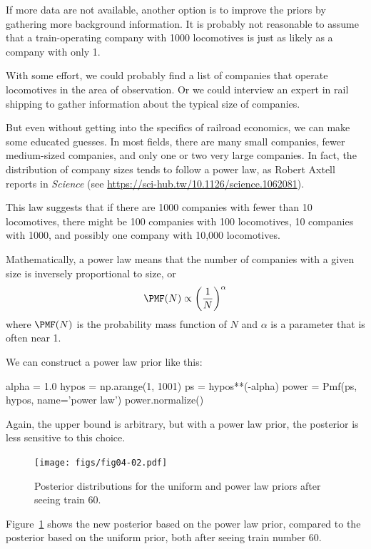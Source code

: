 \documentclass[12pt]{book}
\theoremstyle{exercise}
\begin{document}
If more data are not available, another option is to improve the
priors by gathering more background information.  
It is probably not reasonable to assume that a train-operating company with 1000 locomotives is just as likely as a company with only 1.

With some effort, we could probably find a list of companies that
operate locomotives in the area of observation.
Or we could interview an expert in rail shipping to gather information about the typical size of companies.

But even without getting into the specifics of railroad economics, we
can make some educated guesses.  
In most fields, there are many small
companies, fewer medium-sized companies, and only one or two very
large companies.  
In fact, the distribution of company sizes tends to
follow a power law, as Robert Axtell reports in {\it Science} (see
\url{https://sci-hub.tw/10.1126/science.1062081}).



This law suggests that if there are 1000 companies with fewer than
10 locomotives, there might be 100 companies with 100 locomotives,
10 companies with 1000, and possibly one company with 10,000 locomotives.

Mathematically, a power law means that the number of companies
with a given size is inversely proportional to size, or
%
\[ \PMF(N) \propto \left( \frac{1}{N} \right)^{\alpha}   \]
%
where $\PMF(N)$ is the probability mass function of $N$ and $\alpha$ is
a parameter that is often near 1.

We can construct a power law prior like this:

\begin{code}
alpha = 1.0
hypos = np.arange(1, 1001)
ps = hypos**(-alpha)
power = Pmf(ps, hypos, name='power law')
power.normalize()
\end{code}

Again, the upper bound is arbitrary, but with a power law prior, the posterior is less sensitive to this choice.

\begin{figure}
\centerline{\texttt{[image: figs/fig04-02.pdf]}}
\caption{Posterior distributions for the uniform and power law priors
after seeing train 60.}
\label{fig04-02}
\end{figure}

Figure~\ref{fig04-02} shows the new posterior based on the power law prior, compared to the posterior based on the uniform prior, both after seeing train number 60.
\end{document}
